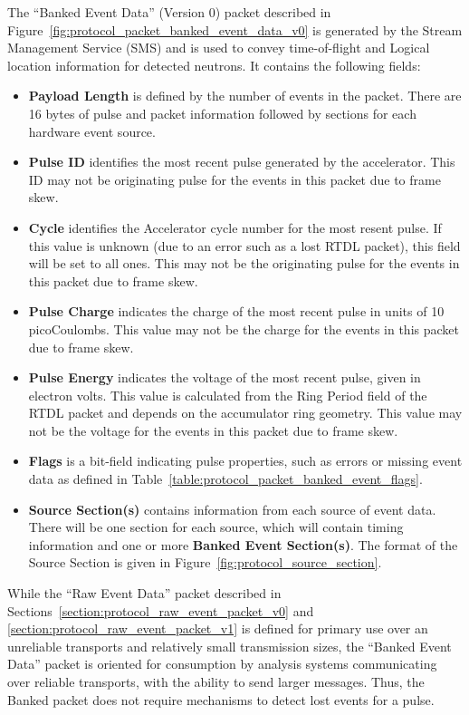 The ``Banked Event Data'' (Version 0) packet described in
Figure~\ref{fig:protocol_packet_banked_event_data_v0} is generated by the
Stream Management Service (SMS) and is used to convey time-of-flight and Logical
location information for detected neutrons. It contains the following fields:
\begin{itemize}
\item{\bf Payload Length} is defined by the number of events in the packet.
There are 16 bytes of pulse and packet information followed by sections for
each hardware event source.
\item{\bf Pulse ID} identifies the most recent pulse generated by the
accelerator. This ID may not be originating pulse for the events in this packet
due to frame skew.
\item{\bf Cycle} identifies the Accelerator cycle number for the most
resent pulse. If this value is unknown (due to an error such as a lost RTDL
packet), this field will be set to all ones. This may not be the originating
pulse for the events in this packet due to frame skew.
\item{\bf Pulse Charge} indicates the charge of the most recent pulse in units
of 10 picoCoulombs. This value may not be the charge for the events in this
packet due to frame skew.
\item{\bf Pulse Energy} indicates the voltage of the most recent pulse,
given in electron volts. This value is calculated from the Ring Period
field of the RTDL packet and depends on the accumulator ring geometry. This
value may not be the voltage for the events in this packet due to frame skew.
\item{\bf Flags} is a bit-field indicating pulse properties, such as errors or
missing event data as defined in
Table~\ref{table:protocol_packet_banked_event_flags}.
\item{\bf Source Section(s)} contains information from each source of event
data. There will be one section for each source, which will contain timing
information and one or more {\bf Banked Event Section(s)}. The format of the
Source Section is given in Figure~\ref{fig:protocol_source_section}.
\end{itemize}

While the ``Raw Event Data'' packet described in
Sections~\ref{section:protocol_raw_event_packet_v0}
and \ref{section:protocol_raw_event_packet_v1}
is defined for primary use over
an unreliable transports and relatively small transmission sizes, the ``Banked
Event Data'' packet is oriented for consumption by analysis systems
communicating over reliable transports, with the ability to send larger
messages. Thus, the Banked packet does not require mechanisms to detect lost
events for a pulse.

